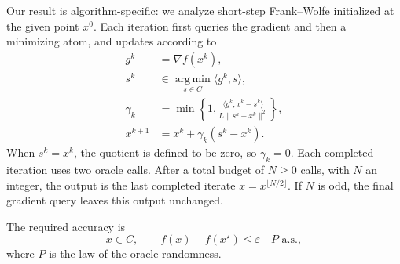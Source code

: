 \documentclass[10pt]{article}
\theoremstyle{definition}
\begin{document}
Our result is algorithm-specific: we analyze short-step Frank--Wolfe initialized at the given point $x^0$. Each iteration first queries the gradient and then a minimizing atom, and updates according to
\[
\begin{aligned}
g^k&=\nabla f(x^k),\\
s^k&\in\operatorname*{arg\,min}_{s\in C}\langle g^k,s\rangle,\\
\gamma_k&=\min\left\{1,
\frac{\langle g^k,x^k-s^k\rangle}{L\|s^k-x^k\|^2}\right\},\\
x^{k+1}&=x^k+\gamma_k(s^k-x^k).
\end{aligned}
\]
When $s^k=x^k$, the quotient is defined to be zero, so $\gamma_k=0$. Each completed iteration uses two oracle calls. After a total budget of $N\geq0$ calls, with $N$ an integer, the output is the last completed iterate $\bar{x}=x^{\lfloor N/2\rfloor}$. If $N$ is odd, the final gradient query leaves this output unchanged.

The required accuracy is
\[
\bar{x}\in C,\qquad f(\bar{x})-f(x^\star)\leq\varepsilon
\quad P\text{-a.s.},
\]
where $P$ is the law of the oracle randomness.
\end{document}

